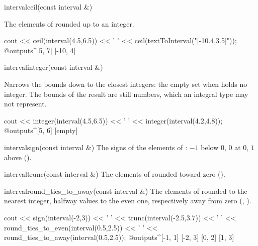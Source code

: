 \documentclass[12pt,a4paper,twoside,openright]{book}
\begin{document}
\begin{deffun}{interval}{ceil}{(const interval \&)}
  \begin{operation}
  \end{operation}
  The elements of  rounded up to an integer.
  \begin{example}
cout << ceil(interval(4.5,6.5)) << ' '
     << ceil(textToInterval("[-10.4,3.5]"));
@outputs^[5, 7] [-10, 4]~
  \end{example}
\end{deffun}

\begin{deffun}{interval}{integer}{(const interval \&)}
  \begin{operation}
  \end{operation}
  Narrows the bounds down to the closest integers: the empty set when
   holds no integer. The bounds of the result are still
   numbers, which an integral type may not represent.
  \begin{example}
cout << integer(interval(4.5,6.5)) << ' '
     << integer(interval(4.2,4.8));
@outputs^[5, 6] [empty]~
  \end{example}
\end{deffun}

\begin{deffun}{interval}{sign}{(const interval \&)}
  The signs of the elements of : $-1$ below $0$, $0$ at $0$, $1$
  above ().\newinvfive
\end{deffun}

\begin{deffun}{interval}{trunc}{(const interval \&)}
  The elements of  rounded toward zero ().\newinvfive
\end{deffun}

\begin{deffun}{interval}{round\_ties\_to\_away}{(const interval \&)}
  The elements of  rounded to the nearest integer, halfway values to
  the even one, respectively away from zero (,
  ).\newinvfive
  \begin{example}
cout << sign(interval(-2,3)) << ' '
     << trunc(interval(-2.5,3.7)) << ' '
     << round_ties_to_even(interval(0.5,2.5)) << ' '
     << round_ties_to_away(interval(0.5,2.5));
@outputs^[-1, 1] [-2, 3] [0, 2] [1, 3]~
  \end{example}
\end{deffun}
\end{document}
